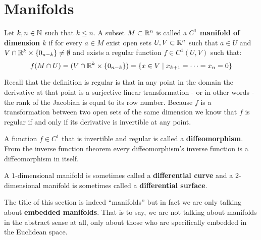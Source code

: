 \documentclass[11pt,a4paper]{article}
\begin{document}
\section{Manifolds}
\begin{definition}
  Let $k,n \in \mathbb{N}$ such that $k \le n$. A subset $M \subset \mathbb{R}^n$
  is called a \textbf{$C^1$ manifold of dimension \textbf{$k$}}
  if for every $a \in M$ exist open sets $U,V \subset \mathbb{R}^n$ such that
  $a \in U$ and $V \cap \mathbb{R}^k \times \{0_{n-k}\} \neq \emptyset$ and 
  exists a regular function $f \in C^1(U,V)$ such that:
  \[
    f(M \cap U) = (V \cap \mathbb{R}^k \times \{0_{n-k}\}) = 
    \{x \in V \mid x_{k+1} = \cdots = x_n = 0\}
  \]
\end{definition}
Recall that the definition is regular is that in any point in the domain
the derivative at that point is a surjective linear transformation - or
in other words - the rank of the Jacobian is equal to its row number.
Because $f$ is a transformation between two open sets of the same
dimension we know that $f$ is regular if and only if its derivative
is invertible at any point.
\begin{definition}
  A function $f \in C^1$ that is invertible and regular is called
  a \textbf{diffeomorphism}. From the inverse function theorem
  every diffeomorphism's inverse function is a diffeomorphism in itself.
\end{definition}
\begin{remark}
  A $1$-dimensional manifold is sometimes called a 
  \textbf{differential curve} and a $2$-dimensional manifold is 
  sometimes called a \textbf{differential surface}.
\end{remark}
The title of this section is indeed ``manifolds'' but in fact we
are only talking about \textbf{embedded manifolds}. That is to say,
we are not talking about manifolds in the abstract sense at all,
only about those who are specifically embedded in the Euclidean space.
\end{document}
